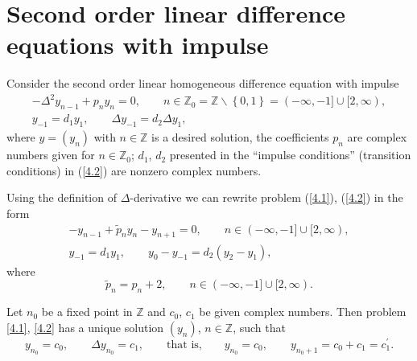 \section[Second order linear difference equations with impulse]{Second order linear dif\/ference equations with impulse}\label{section4}

Consider the second order linear homogeneous dif\/ference equation with impulse%
\begin{gather}
-\Delta ^{2}y_{n-1}+p_{n}y_{n}=0,\qquad n\in \mathbb{Z}_{0}=%
\mathbb{Z}
\backslash \left\{ 0,1\right\} =(-\infty ,-1]\cup \lbrack 2,\infty ),
\label{4.1}
\\
y_{-1}=d_{1}y_{1},\qquad \Delta y_{-1}=d_{2}\Delta y_{1},  \label{4.2}
\end{gather}%
where $y=\left( y_{n}\right) $ with $n\in \mathbb{Z}
$ is a desired solution, the coef\/f\/icients $p_{n}$ are complex numbers given
for $n\in
\mathbb{Z}
_{0}$; $d_{1}$, $d_{2}$ presented in the ``impulse conditions'' (transition
conditions) in (\ref{4.2}) are nonzero complex numbers.

Using the def\/inition of $\Delta $-derivative we can rewrite problem (\ref{4.1}), (\ref{4.2}) in the form%
\begin{gather}
-y_{n-1}+\widetilde{p}_{n}y_{n}-y_{n+1}=0,\qquad n\in (-\infty ,-1]\cup
\lbrack 2,\infty ),  \label{4.3}
\\
y_{-1}=d_{1}y_{1},\qquad y_{0}-y_{-1}=d_{2}(y_{2}-y_{1}),  \label{4.4}
\end{gather}%
where%
\[
\widetilde{p}_{n}=p_{n}+2,\qquad n\in (-\infty ,-1]\cup \lbrack
2,\infty ).
\]

\begin{theorem}
\label{Th4.1}Let $n_{0}$ be a fixed point in $\mathbb{Z}$ and $c_{0}$, $c_{1}$ be given complex numbers. Then problem \eqref{4.1}, \eqref{4.2} has a unique solution $(y_{n})$, $n\in
\mathbb{Z}$, such that%
\begin{equation}
y_{n_{0}}=c_{0},\qquad \Delta y_{n_{0}}=c_{1},\qquad \text{that is,}\qquad
y_{n_{0}}=c_{0},\qquad y_{n_{0}+1}=c_{0}+c_{1}=c_{1}^{\prime }.
\label{4.5}
\end{equation}
\end{theorem}

